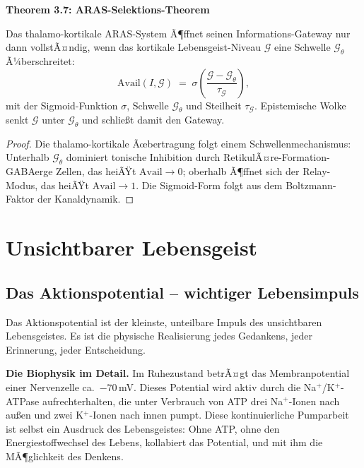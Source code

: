 ﻿\documentclass[12pt,a4paper]{report}
\theoremstyle{plain}
\theoremstyle{definition}
\theoremstyle{remark}
\begin{document}
	
	\noindent\textbf{Theorem 3.7: ARAS-Selektions-Theorem}

		\label{thm:aras}
		Das thalamo-kortikale ARAS-System Ã¶ffnet seinen Informations-Gateway
		nur dann vollstÃ¤ndig, wenn das kortikale Lebensgeist-Niveau $\mathcal{G}$
		eine Schwelle $\mathcal{G}_{\theta}$ Ã¼berschreitet:
		\[
		\mathrm{Avail}(I, \mathcal{G})
		\;=\;
		\sigma\!\left(\frac{\mathcal{G} - \mathcal{G}_\theta}{\tau_\mathcal{G}}\right),
		\]
		mit der Sigmoid-Funktion $\sigma$, Schwelle $\mathcal{G}_\theta$ und
		Steilheit $\tau_\mathcal{G}$.
		Epistemische Wolke senkt $\mathcal{G}$ unter $\mathcal{G}_\theta$
		und schlie\ss{}t damit den Gateway.

	
	\begin{proof}
		Die thalamo-kortikale Ãœbertragung folgt einem Schwellenmechanismus:
		Unterhalb $\mathcal{G}_\theta$ dominiert tonische Inhibition durch
		RetikulÃ¤re-Formation-GABAerge Zellen, das heiÃŸt $\mathrm{Avail} \to 0$;
		oberhalb Ã¶ffnet sich der Relay-Modus, das heiÃŸt $\mathrm{Avail} \to 1$.
		Die Sigmoid-Form folgt aus dem Boltzmann-Faktor der Kanaldynamik. 
	\end{proof}
	
	\chapter{Unsichtbarer Lebensgeist}
	
	\section{Das Aktionspotential -- wichtiger Lebensimpuls}
	
	Das Aktionspotential ist der kleinste, unteilbare Impuls des
	unsichtbaren Lebensgeistes. Es ist die physische Realisierung jedes
	Gedankens, jeder Erinnerung, jeder Entscheidung.
	
	\textbf{Die Biophysik im Detail.}
	Im Ruhezustand betrÃ¤gt das Membranpotential einer Nervenzelle
	ca.\ $-70$\,mV. Dieses Potential wird aktiv durch die
	Na$^+$/K$^+$-ATPase aufrechterhalten, die unter Verbrauch von ATP
	drei Na$^+$-Ionen nach au\ss{}en und zwei K$^+$-Ionen nach innen pumpt.
	Diese kontinuierliche Pumparbeit ist selbst ein Ausdruck des
	Lebensgeistes: Ohne ATP, ohne den Energiestoffwechsel des Lebens,
	kollabiert das Potential, und mit ihm die MÃ¶glichkeit des Denkens.
	
\end{document}
